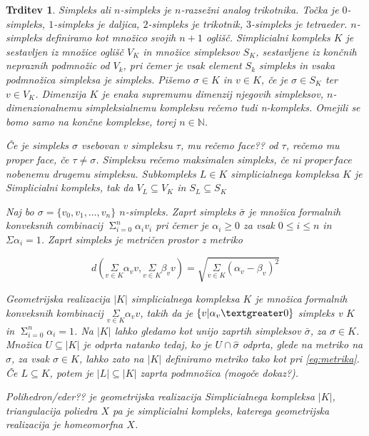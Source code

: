 \documentclass[a4paper,12pt]{article}
\newcommand\mymathop[1]{\mathop{\operatorname{#1}}}
\theoremstyle{definition}
\theoremstyle{plain}
\theoremstyle{definition}
\theoremstyle{plain}
\newtheorem{trditev}{Trditev}
\theoremstyle{plain}
\theoremstyle{plain}
\theoremstyle{plain}
\begin{document}
\begin{trditev}
    \textit{Simpleks} ali $n$-simpleks je $n$-razsežni analog trikotnika. Točka je $0$-simpleks, $1$-simpleks je daljica, $2$-simpleks je trikotnik,
$3$-simpleks je tetraeder. $n$-simpleks definiramo kot množico svojih $n+1$ oglišč. \textit{Simplicialni kompleks $K$} je sestavljen iz množice oglišč $V_K$ in množice simpleksov $S_K$, sestavljene iz končnih nepraznih podmnožic od $V_k$, pri čemer je vsak element $S_k$ simpleks in vsaka podmnožica simpleksa je simpleks. Pišemo $\sigma \in K$ in $v \in K$, če je $\sigma \in S_K$ ter $v \in V_K$. Dimenzija $K$ je enaka supremumu dimenzij njegovih simpleksov, $n$-dimenzionalnemu simpleksialnemu kompleksu rečemo tudi \textit{n-kompleks}. Omejili se bomo samo na končne komplekse, torej $n \in \mathbb{N}$.

Če je simpleks $\sigma$ vsebovan  v simpleksu $\tau$, mu rečemo \textit{face??} od $\tau$, rečemo mu \textit{proper face}, če $\tau\neq \sigma$. Simpleksu rečemo \textit{maksimalen simpleks}, če ni $proper face$ nobenemu drugemu simpleksu. Subkompleks $L\in K$ simplicialnega kompleksa $K$ je Simplicialni kompleks, tak da $V_L\subseteq V_K$ in $S_L\subseteq S_K$


Naj bo $\sigma = \{v_0,v_1,\ldots,v_n\}$ $n$-simpleks. Zaprt
simpleks $\bar{\sigma}$ je množica formalnih konveksnih combinacij $\mymathop{\Sigma}_{i=0}^{n}\alpha_i v_i$
pri čemer je $\alpha_i \ge 0$ za vsak $0\le i \le n$ in $\Sigma \alpha_i = 1$. Zaprt simpleks je metričen prostor z metriko

\begin{equation}
\label{eq:metrika}
d(\underset{v \in K}{\Sigma}\alpha_v v,\underset{v \in K}{\Sigma}\beta_v v) = \sqrt{\underset{v \in K}{\Sigma}(\alpha_v - \beta_v)^2}
\end{equation}

\textit{Geometrijska realizacija} $|K|$ simplicialnega kompleksa $K$ je 
množica formalnih konveksnih kombinacij $\underset{v \in K}{\Sigma}\alpha_v v$, takih da je $\{v | \alpha_v \textgreater 0\}$ simpleks v $K$ in $\mymathop{\Sigma}_{i=0}^{n}\alpha_i=1$.
Na $|K|$ lahko gledamo kot unijo zaprtih simpleksov $\bar{\sigma}$, za $\sigma \in K$. Množica $U\subseteq |K|$ je odprta natanko tedaj, ko je $U \cap \hat{\sigma}$ odprta, glede na metriko na $\hat{\sigma}$, za vsak $\sigma \in K$, lahko zato na $|K|$ definiramo metriko tako kot pri \ref{eq:metrika}. Če $L\subseteq K$, potem je $|L|\subseteq |K|$ zaprta podmnožica (mogoče dokaz?).

\textit{Polihedron/eder??} je geometrijska realizacija Simplicialnega kompleksa $|K|$, \textit{triangulacija} poliedra $X$ pa je simplicialni kompleks, katerega geometrijska realizacija je homeomorfna $X$.


\end{trditev}
\end{document}
